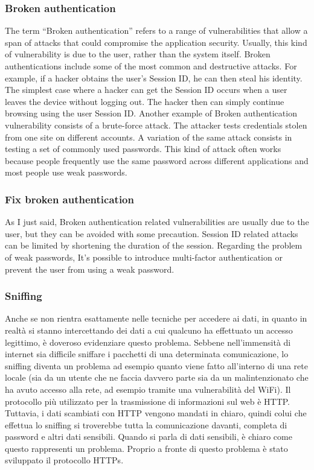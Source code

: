 \documentclass[12pt]{article}
\begin{document}
\bigskip
\subsubsection{Broken authentication} 
The term “Broken authentication” refers to a range of vulnerabilities that allow a span of attacks that could compromise the application security.
Usually, this kind of vulnerability is due to the user, rather than the system itself.
Broken authentications include some of the most common and destructive attacks.
For example, if a hacker obtains the user’s Session ID, he can then steal his identity.
The simplest case where a hacker can get the Session ID occurs when a user leaves the device without logging out. The hacker then can simply continue browsing using the user Session ID.
Another example of Broken authentication vulnerability consists of a brute-force attack.
The attacker tests credentials stolen from one site on different accounts.
A variation of the same attack consists in testing a set of commonly used passwords.
This kind of attack often works because people frequently use the same password across different applications and most people use weak passwords.

\bigskip
\subsubsection{Fix broken authentication}
As I just said, Broken authentication related vulnerabilities are usually due to the user, but they can be avoided with some precaution.
Session ID related attacks can be limited by shortening the duration of the session.
Regarding the problem of weak passwords, It’s possible to introduce multi-factor authentication or prevent the user from using a weak password.

\bigskip
\subsubsection{Sniffing}
Anche se non rientra esattamente nelle tecniche per accedere ai dati, in quanto in realtà si stanno intercettando dei dati a cui qualcuno ha effettuato un accesso legittimo, è doveroso evidenziare questo problema.
Sebbene nell’immensità di internet sia difficile sniffare i pacchetti di una determinata comunicazione, lo sniffing diventa un problema ad esempio quanto viene fatto all’interno di una rete locale (sia da un utente che ne faccia davvero parte sia da un malintenzionato che ha avuto accesso alla rete, ad esempio tramite una vulnerabilità del WiFi).
Il protocollo più utilizzato per la trasmissione di informazioni sul web è HTTP. Tuttavia, i dati scambiati con HTTP vengono mandati in chiaro, quindi colui che effettua lo sniffing si troverebbe tutta la comunicazione davanti, completa di password e altri dati sensibili. Quando si parla di dati sensibili, è chiaro come questo rappresenti un problema.
Proprio a fronte di questo problema è stato sviluppato il protocollo HTTPs.
\end{document}
